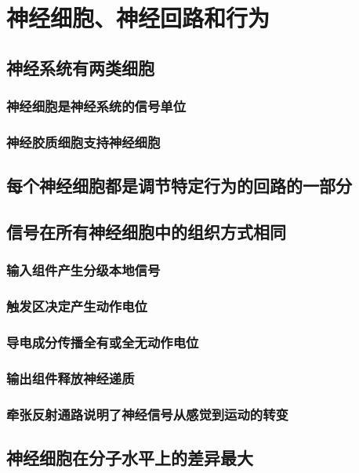 \chapter{神经细胞、神经回路和行为}

\section{神经系统有两类细胞}

\subsection{神经细胞是神经系统的信号单位}

\subsection{神经胶质细胞支持神经细胞}


\section{每个神经细胞都是调节特定行为的回路的一部分}

\section{信号在所有神经细胞中的组织方式相同}
\subsection{输入组件产生分级本地信号}
\subsection{触发区决定产生动作电位}
\subsection{导电成分传播全有或全无动作电位}
\subsection{输出组件释放神经递质}
\subsection{牵张反射通路说明了神经信号从感觉到运动的转变}


\section{神经细胞在分子水平上的差异最大}

